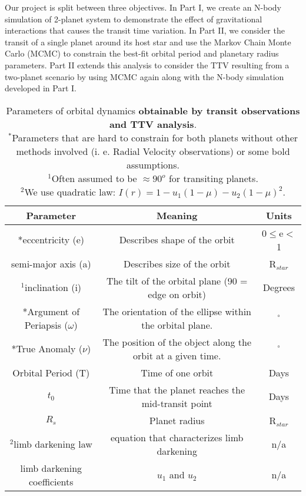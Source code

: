 \documentclass[linenumbers]{aastex631}
\begin{document}
 \par \vspace{.1 cm}
Our project is split between three objectives. In Part I, we create an N-body simulation of 2-planet system to demonstrate the effect of gravitational interactions that causes the transit time variation. In Part II, we consider the transit of a single planet around its host star and use the Markov Chain Monte Carlo (MCMC) to constrain the best-fit orbital period and planetary radius parameters. Part II extends this analysis to consider the TTV resulting from a two-planet scenario by using MCMC again along with the N-body simulation developed in Part I.
\vspace{1cm}
\begin{table}[h!]
    \centering
    \begin{tabular}{||c|c|c||}
         \hline
         Parameter & Meaning & Units \\ [0.5ex] 
         \hline\hline 
         *eccentricity (e) & Describes shape of the orbit & 0$\leq$e$<$1  \\
         \hline 
         semi-major axis (a) & Describes size of the orbit & R$_{star}$ \\
         \hline
         $^1$inclination (i) & The tilt of the orbital plane (90 = edge on orbit) & Degrees  \\
         \hline
         *Argument of Periapsis ($\omega$) & The orientation of the ellipse within the orbital plane. & $^{\circ}$ \\
         \hline
         *True Anomaly ($\nu$) & The position of the object along the orbit at a given time. & $^{\circ}$ \\
         \hline
         Orbital Period (T) & Time of one orbit & Days \\ 
         \hline
         $t_{0}$ & Time that the planet reaches the mid-transit point & Days\\
         \hline
         $R_{s}$ & Planet radius & R$_{star}$  \\
         \hline
         $^2$limb darkening law & equation that characterizes limb darkening & n/a \\
         \hline
         limb darkening coefficients & $u_1$ and $u_2$& n/a \\ [1ex] 
         \hline
    \end{tabular}
    \caption{Parameters of orbital dynamics \textbf{obtainable by transit observations and TTV analysis}.\\ $^*$Parameters that are hard to constrain for both planets without other methods involved (i. e. Radial Velocity observations) or some bold assumptions. \\ $^1$Often assumed to be $\approx90^o$ for transiting planets. \\ $^2$We use quadratic law: $I(r)=1 - u_1(1 - \mu) - u_2(1 - \mu)^2$.}
    \label{observed_params}
\end{table}
\end{document}

